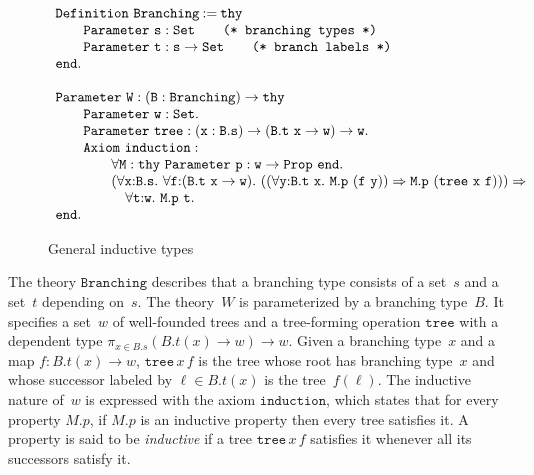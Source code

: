 \begin{figure}
\[
\begin{array}{l}
\iDefinition{\mathtt{Branching}}{\mathtt{thy}}\\
\qquad\iParameter{\mathtt{s}}{\iSet} \qquad\mbox{\tt (* branching types *)}\\
\qquad\iParameter{\mathtt{t}}{\mathtt{s}\to\iSet}\qquad \mbox{\tt (* branch labels *)}\\
\mathtt{end}.\\
\\
\iParameter{\mathtt{W}}{(\mathtt{B} : \mathtt{Branching}) \to \mathtt{thy}}\\
\qquad\iParameter{\mathtt{w}}{\iSet}.\\
\qquad\iParameter{\mathtt{tree}}{(\mathtt{x} : \mathtt{B.s})\to (\mathtt{B.t\ x}\to \mathtt{w})\to \mathtt{w}.}\\
\qquad\iAxiom{\mathtt{induction}}{}\\
\qquad\qquad{\forall\mathtt{M} : \mathtt{thy}\ \iParameter{\mathtt{p}}{\mathtt{w}\to\iProp}\ \mathtt{end}.\ }\\
\qquad\qquad(\forall \mathtt{x}{:}\mathtt{B.s}.\ \forall\mathtt{f}{:}{(\mathtt{B.t\ x}\to\mathtt{w})}. \ 
   ((\forall \mathtt{y}{:}\mathtt{B.t\ x}.\ \mathtt{M.p}\ (\mathtt{f\ y})) \Rightarrow \mathtt{M.p}\ (\mathtt{tree\ x\ f}))) \Rightarrow \\
\qquad\qquad\quad\forall \mathtt{t}{:}\mathtt{w}.\ \mathtt{M.p\ t}.\\
\mathtt{end}.
\iffalse
	Parameter W : [B : Branching] ->
	thy
	  Parameter w : Set.
	  Parameter tree : [x : B.s] -> (B.t x -> w) -> w.
	  Axiom induction:
	    forall M : thy Parameter p : w -> Prop. end,
	    (forall x : B.s, forall f : B.t x -> w,
	       ((forall y : B.t x, M.p (f y)) -> M.p (tree x f))) ->
	    forall t : w, M.p t.
	end.	
\fi
\end{array}
\]
  \caption{General inductive types}
  \label{fig:wtype}
\end{figure}
%
The theory $\mathtt{Branching}$ describes that a branching type
consists of a set~$s$ and a set~$t$ depending on~$s$. The theory~$W$ is
parameterized by a branching type~$B$. It specifies a set~$w$ of
well-founded trees and a tree-forming operation $\mathtt{tree}$ with a
dependent type $\pi_{x \in B.s} (B.t(x) \to w) \to w$. Given a
branching type~$x$ and a map $f : B.t(x) \to w$, $\mathtt{tree}\,x\,f$
is the tree whose root has branching type~$x$ and whose successor
labeled by $\ell \in B.t(x)$ is the tree~$f(\ell)$. The inductive
nature of~$w$ is expressed with the axiom $\mathtt{induction}$, which
states that for every property $M.p$, if $M.p$ is an inductive
property then every tree satisfies it. A property is said to be
\emph{inductive} if a tree $\mathtt{tree}\,x\,f$ satisfies it whenever
all its successors satisfy it.

